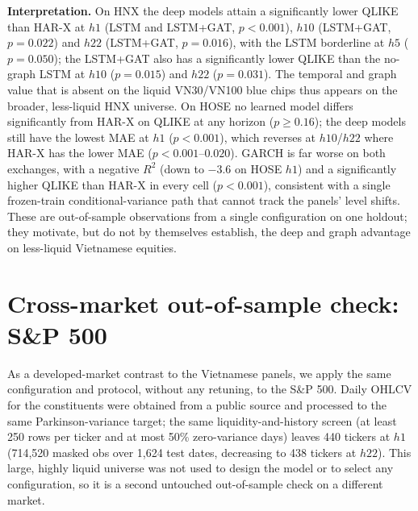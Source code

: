 \documentclass[runningheads]{llncs}
\begin{document}
\textbf{Interpretation.} On HNX the deep models attain a significantly lower QLIKE than HAR-X at $h1$
(LSTM and LSTM+GAT, $p<0.001$), $h10$ (LSTM+GAT, $p=0.022$) and $h22$ (LSTM+GAT, $p=0.016$), with the LSTM
borderline at $h5$ ($p=0.050$); the LSTM+GAT also has a significantly lower QLIKE than the no-graph LSTM at
$h10$ ($p=0.015$) and $h22$ ($p=0.031$). The temporal and graph value that is absent on the liquid VN30/VN100
blue chips thus appears on the broader, less-liquid HNX universe. On HOSE no learned model differs
significantly from HAR-X on QLIKE at any horizon ($p\ge0.16$); the deep models still have the lowest MAE at
$h1$ ($p<0.001$), which reverses at $h10$/$h22$ where HAR-X has the lower MAE ($p<0.001$--$0.020$). GARCH is
far worse on both exchanges, with a negative $R^2$ (down to $-3.6$ on HOSE $h1$) and a significantly
higher QLIKE than HAR-X in every cell ($p<0.001$), consistent with a single frozen-train conditional-variance
path that cannot track the panels' level shifts.
These are out-of-sample observations from a single configuration on one holdout; they motivate, but do not by
themselves establish, the deep and graph advantage on less-liquid Vietnamese equities.

\section{Cross-market out-of-sample check: S\&P 500}\label{sec:sp500}
As a developed-market contrast to the Vietnamese panels, we apply the same configuration and protocol,
without any retuning, to the S\&P 500. Daily OHLCV for the constituents were obtained from a public source and
processed to the same Parkinson-variance target; the same liquidity-and-history screen (at least 250 rows per
ticker and at most 50\% zero-variance days) leaves 440 tickers at $h1$ (714{,}520 masked obs over 1{,}624 test
dates, decreasing to 438 tickers at $h22$). This large, highly liquid universe was not used to design the model
or to select any configuration, so it is a second untouched out-of-sample check on a different market.

\begin{table}[t]
\centering
\caption{S\&P 500 (714{,}520 masked obs over 1{,}624 test dates at $h1$; learned models: seed mean, QLIKE
$\pm$~per-seed std). Lower is better for MSE/RMSE/MAE/QLIKE, higher for $R^2$. $^{\dagger}$~marks metrics where LSTM+GAT improves over the no-graph
LSTM. MSE $\times10^{-7}$, RMSE $\times10^{-4}$, MAE $\times10^{-4}$.}
\label{tab:sp500}
\footnotesize
\setlength{\tabcolsep}{5pt}

\end{table}
\end{document}
